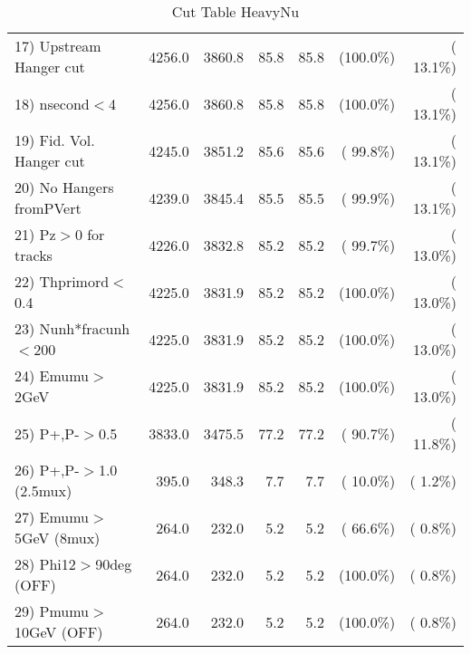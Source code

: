 \begin{table}[h!]
\begin{tabular}{||l||r|r|r|r|r|r||}
 17) Upstream Hanger cut  &       4256.0 &       3860.8 &         85.8 &         85.8 & (100.0\%) & ( 13.1\%) \\
 18) nsecond$<$4          &       4256.0 &       3860.8 &         85.8 &         85.8 & (100.0\%) & ( 13.1\%) \\
 19) Fid. Vol. Hanger cut &       4245.0 &       3851.2 &         85.6 &         85.6 & ( 99.8\%) & ( 13.1\%) \\
 20) No Hangers fromPVert &       4239.0 &       3845.4 &         85.5 &         85.5 & ( 99.9\%) & ( 13.1\%) \\
 21) Pz$>$0 for tracks    &       4226.0 &       3832.8 &         85.2 &         85.2 & ( 99.7\%) & ( 13.0\%) \\
 22) Thprimord$<$0.4      &       4225.0 &       3831.9 &         85.2 &         85.2 & (100.0\%) & ( 13.0\%) \\
 23) Nunh*fracunh$<$200   &       4225.0 &       3831.9 &         85.2 &         85.2 & (100.0\%) & ( 13.0\%) \\
 24) Emumu$>$2GeV         &       4225.0 &       3831.9 &         85.2 &         85.2 & (100.0\%) & ( 13.0\%) \\
 25) P+,P-$>$0.5          &       3833.0 &       3475.5 &         77.2 &         77.2 & ( 90.7\%) & ( 11.8\%) \\
 26) P+,P-$>$1.0 (2.5mux) &        395.0 &        348.3 &          7.7 &          7.7 & ( 10.0\%) & (  1.2\%) \\
 27) Emumu$>$5GeV  (8mux) &        264.0 &        232.0 &          5.2 &          5.2 & ( 66.6\%) & (  0.8\%) \\
 28) Phi12$>$90deg  (OFF) &        264.0 &        232.0 &          5.2 &          5.2 & (100.0\%) & (  0.8\%) \\
 29) Pmumu$>$10GeV  (OFF) &        264.0 &        232.0 &          5.2 &          5.2 & (100.0\%) & (  0.8\%) \\
 \hline
 \hline
 \end{tabular}
 \caption{Cut Table  HeavyNu  }
 \label{tab-cutheavy_neutrino}
 \end{table}
